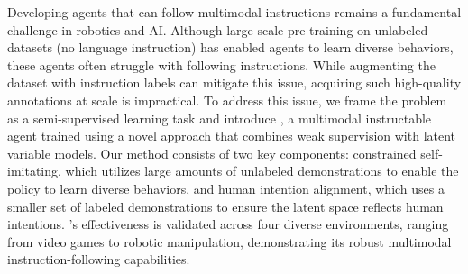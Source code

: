 Developing agents that can follow multimodal instructions remains a fundamental challenge in robotics and AI. Although large-scale pre-training on unlabeled datasets (no language instruction) has enabled agents to learn diverse behaviors, these agents often struggle with following instructions. While augmenting the dataset with instruction labels can mitigate this issue, acquiring such high-quality annotations at scale is impractical. 
To address this issue, we frame the problem as a semi-supervised learning task and introduce \agent, a multimodal instructable agent trained using a novel approach that combines weak supervision with latent variable models. Our method consists of two key components: constrained self-imitating, which utilizes large amounts of unlabeled demonstrations to enable the policy to learn diverse behaviors, and human intention alignment, which uses a smaller set of labeled demonstrations to ensure the latent space reflects human intentions. \agent's effectiveness is validated across four diverse environments, ranging from video games to robotic manipulation, demonstrating its robust multimodal instruction-following capabilities. 